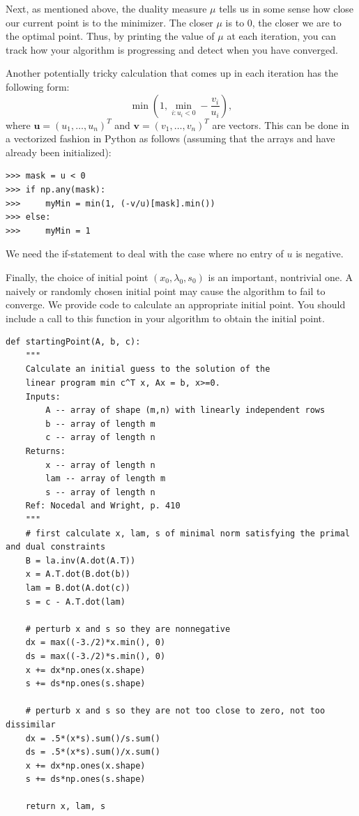 Next, as mentioned above, the duality measure $\mu$ tells us in some sense how close our current point is to the minimizer.
The closer $\mu$ is to 0, the closer we are to the optimal point. Thus, by printing the value of $\mu$ at
each iteration, you can track how your algorithm is progressing and detect when you have converged.

Another potentially tricky calculation that comes up in each iteration has the following form:
\[
\min\left(1, \displaystyle\min_{i : u_i < 0}-\frac{v_i}{u_i}\right),
\]
where $\mathbf{u} = (u_1, \ldots, u_n)^T$ and $\mathbf{v} = (v_1, \ldots, v_n)^T$ are vectors.
This can be done in a vectorized fashion in Python as follows (assuming that the arrays  and 
have already been initialized):
\begin{lstlisting}
>>> mask = u < 0
>>> if np.any(mask):
>>>     myMin = min(1, (-v/u)[mask].min())
>>> else:
>>>     myMin = 1
\end{lstlisting}
We need the if-statement to deal with the case where no entry of $u$ is negative.

Finally, the choice of initial point $(x_0, \lambda_0, s_0)$ is an important, nontrivial one.
A naively or randomly chosen initial point may cause the algorithm to fail to converge.
We provide code to calculate an appropriate initial point. You should include a call to this function in your algorithm to obtain the initial point.

\begin{lstlisting}
def startingPoint(A, b, c):
    """
    Calculate an initial guess to the solution of the
    linear program min c^T x, Ax = b, x>=0.
    Inputs:
        A -- array of shape (m,n) with linearly independent rows
        b -- array of length m
        c -- array of length n
    Returns:
        x -- array of length n
        lam -- array of length m
        s -- array of length n
    Ref: Nocedal and Wright, p. 410
    """
    # first calculate x, lam, s of minimal norm satisfying the primal and dual constraints
    B = la.inv(A.dot(A.T))
    x = A.T.dot(B.dot(b))
    lam = B.dot(A.dot(c))
    s = c - A.T.dot(lam)

    # perturb x and s so they are nonnegative
    dx = max((-3./2)*x.min(), 0)
    ds = max((-3./2)*s.min(), 0)
    x += dx*np.ones(x.shape)
    s += ds*np.ones(s.shape)

    # perturb x and s so they are not too close to zero, not too dissimilar
    dx = .5*(x*s).sum()/s.sum()
    ds = .5*(x*s).sum()/x.sum()
    x += dx*np.ones(x.shape)
    s += ds*np.ones(s.shape)

    return x, lam, s
\end{lstlisting}


